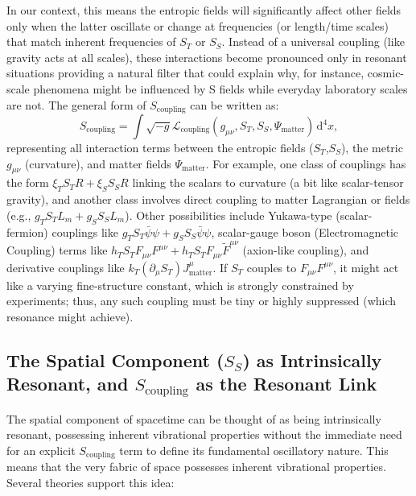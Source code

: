 \documentclass[11pt,a4paper]{article} %
\newcommand{\ST}{S_T}
\newcommand{\SSp}{S_S} %
\newcommand{\Scoupling}{S_{\text{coupling}}}
\newcommand{\Lm}{L_m}
\newcommand{\Psimatter}{\Psi_{\text{matter}}}
\begin{document}
In our context, this means the entropic fields will significantly affect other fields only when the latter oscillate or change at frequencies (or length/time scales) that match inherent frequencies of $\ST$ or $\SSp$. Instead of a universal coupling (like gravity acts at all scales), these interactions become pronounced only in resonant situations providing a natural filter that could explain why, for instance, cosmic-scale phenomena might be influenced by S fields while everyday laboratory scales are not. The general form of $\Scoupling$ can be written as:
\begin{equation}
\Scoupling=\int\sqrt{-g}\mathcal{L}_{\text{coupling}}(g_{\mu\nu},\ST,\SSp,\Psimatter)\,\text{d}^4x ,
\end{equation}
representing all interaction terms between the entropic fields ($\ST$,$\SSp$), the metric $g_{\mu\nu}$ (curvature), and matter fields $\Psimatter$. For example, one class of couplings has the form $\xi_T\ST R+\xi_S\SSp R$ linking the scalars to curvature (a bit like scalar-tensor gravity), and another class involves direct coupling to matter Lagrangian or fields (e.g., $g_T\ST\Lm+g_S\SSp\Lm$). Other possibilities include Yukawa-type (scalar-fermion) couplings like $g_T\ST\bar{\psi}\psi+g_S\SSp\bar{\psi}\psi$, scalar-gauge boson (Electromagnetic Coupling) terms like $h_T\ST F_{\mu\nu}F^{\mu\nu}+h_T\ST F_{\mu\nu}\tilde{F}^{\mu\nu}$ (axion-like coupling), and derivative couplings like $k_T(\partial_\mu\ST)J^{\mu}_{\text{matter}}$. If $\ST$ couples to $F_{\mu\nu}F^{\mu\nu}$, it might act like a varying fine-structure constant, which is strongly constrained by experiments; thus, any such coupling must be tiny or highly suppressed (which resonance might achieve).

\subsection{The Spatial Component ($\SSp$) as Intrinsically Resonant, and $\Scoupling$ as the Resonant Link}
The spatial component of spacetime can be thought of as being intrinsically resonant, possessing inherent vibrational properties without the immediate need for an explicit $\Scoupling$ term to define its fundamental oscillatory nature. This means that the very fabric of space possesses inherent vibrational properties. Several theories support this idea:
\end{document}

